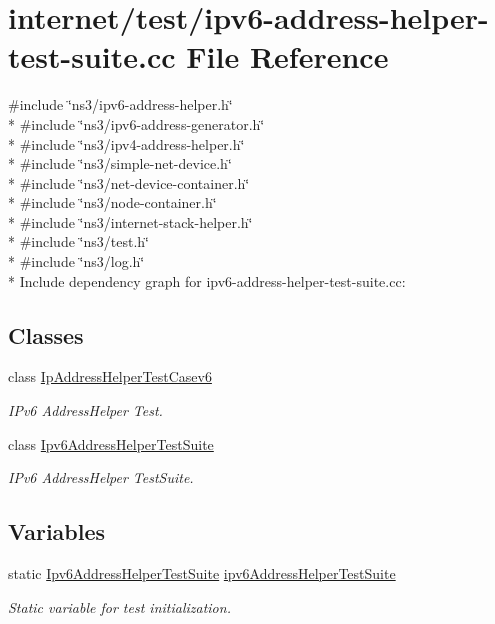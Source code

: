 \hypertarget{ipv6-address-helper-test-suite_8cc}{}\section{internet/test/ipv6-\/address-\/helper-\/test-\/suite.cc File Reference}
\label{ipv6-address-helper-test-suite_8cc}
{\ttfamily \#include \char`\"{}ns3/ipv6-\/address-\/helper.\+h\char`\"{}}\\*
{\ttfamily \#include \char`\"{}ns3/ipv6-\/address-\/generator.\+h\char`\"{}}\\*
{\ttfamily \#include \char`\"{}ns3/ipv4-\/address-\/helper.\+h\char`\"{}}\\*
{\ttfamily \#include \char`\"{}ns3/simple-\/net-\/device.\+h\char`\"{}}\\*
{\ttfamily \#include \char`\"{}ns3/net-\/device-\/container.\+h\char`\"{}}\\*
{\ttfamily \#include \char`\"{}ns3/node-\/container.\+h\char`\"{}}\\*
{\ttfamily \#include \char`\"{}ns3/internet-\/stack-\/helper.\+h\char`\"{}}\\*
{\ttfamily \#include \char`\"{}ns3/test.\+h\char`\"{}}\\*
{\ttfamily \#include \char`\"{}ns3/log.\+h\char`\"{}}\\*
Include dependency graph for ipv6-\/address-\/helper-\/test-\/suite.cc\+:
\subsection*{Classes}
\begin{DoxyCompactItemize}
\item 
class \hyperlink{classIpAddressHelperTestCasev6}{Ip\+Address\+Helper\+Test\+Casev6}
\begin{DoxyCompactList}\small\item\em I\+Pv6 Address\+Helper Test. \end{DoxyCompactList}\item 
class \hyperlink{classIpv6AddressHelperTestSuite}{Ipv6\+Address\+Helper\+Test\+Suite}
\begin{DoxyCompactList}\small\item\em I\+Pv6 Address\+Helper Test\+Suite. \end{DoxyCompactList}\end{DoxyCompactItemize}
\subsection*{Variables}
\begin{DoxyCompactItemize}
\item 
static \hyperlink{classIpv6AddressHelperTestSuite}{Ipv6\+Address\+Helper\+Test\+Suite} \hyperlink{ipv6-address-helper-test-suite_8cc_afa1e898acf4c4a975a7ded3a147b0bbd}{ipv6\+Address\+Helper\+Test\+Suite}
\begin{DoxyCompactList}\small\item\em Static variable for test initialization. \end{DoxyCompactList}\end{DoxyCompactItemize}


